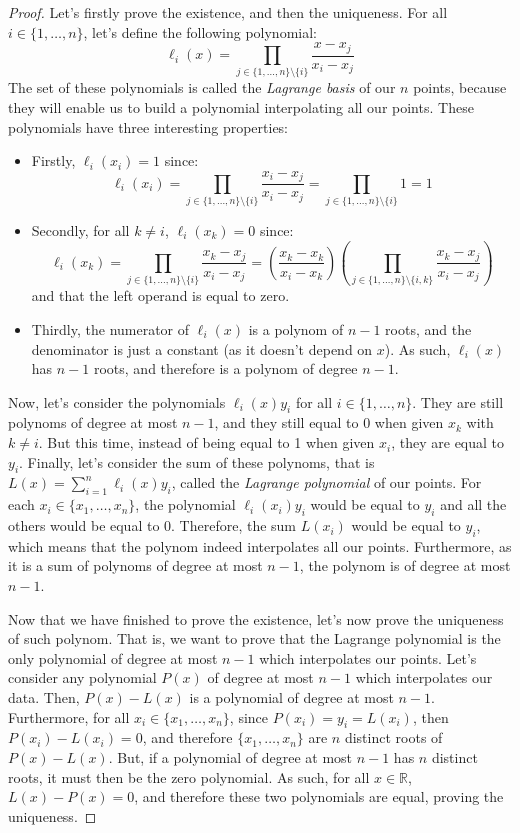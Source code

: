 \documentclass{article}
\theoremstyle{definition}
\theoremstyle{remark}
\theoremstyle{example}
\begin{document}
\begin{proof}
    Let's firstly prove the existence, and then the uniqueness. For all $i \in \{1, \dots, n\}$, let's define the following polynomial:
        $$\ell_i(x) = \prod_{j \in \{1, \dots, n\} \setminus \{i\}} \frac{x - x_j}{x_i - x_j}$$
    The set of these polynomials is called the \textit{Lagrange basis} of our $n$ points, because they will enable us to build a polynomial interpolating all our points. These polynomials have three interesting properties:
    \begin{itemize}
        \item Firstly, $\ell_i(x_i) = 1$ since:
            $$\ell_i(x_i) = \prod_{j \in \{1, \dots, n\} \setminus \{i\}} \frac{x_i - x_j}{x_i - x_j} = \prod_{j \in \{1, \dots, n\} \setminus \{i\}} 1 = 1$$
        \item Secondly, for all $k \neq i$, $\ell_i(x_k) = 0$ since:
        $$\ell_i(x_k) = \prod_{j \in \{1, \dots, n\} \setminus \{i\}} \frac{x_k - x_j}{x_i - x_j} = \left(\frac{x_k - x_k}{x_i - x_k}\right)\left(\prod_{j \in \{1, \dots, n\} \setminus \{i, k\}} \frac{x_k - x_j}{x_i - x_j}\right)$$
        and that the left operand is equal to zero.
        \item Thirdly, the numerator of $\ell_i(x)$ is a polynom of $n-1$ roots, and the denominator is just a constant (as it doesn't depend on $x$). As such, $\ell_i(x)$ has $n-1$ roots, and therefore is a polynom of degree $n-1$.
    \end{itemize}
    Now, let's consider the polynomials $\ell_i(x)y_i$ for all $i \in \{1, \dots, n\}$. They are still polynoms of degree at most $n-1$, and they still equal to 0 when given $x_k$ with $k \neq i$. But this time, instead of being equal to 1 when given $x_i$, they are equal to $y_i$. Finally, let's consider the sum of these polynoms, that is $L(x) = \sum_{i=1}^n \ell_i(x)y_i$, called the \textit{Lagrange polynomial} of our points. For each $x_i \in \{x_1, \dots, x_n\}$, the polynomial $\ell_i(x_i)y_i$ would be equal to $y_i$ and all the others would be equal to 0. Therefore, the sum $L(x_i)$ would be equal to $y_i$, which means that the polynom indeed interpolates all our points. Furthermore, as it is a sum of polynoms of degree at most $n-1$, the polynom is of degree at most $n-1$.

    Now that we have finished to prove the existence, let's now prove the uniqueness of such polynom. That is, we want to prove that the Lagrange polynomial is the only polynomial of degree at most $n-1$ which interpolates our points. Let's consider any polynomial $P(x)$ of degree at most $n-1$ which interpolates our data. Then, $P(x) - L(x)$ is a polynomial of degree at most $n-1$. Furthermore, for all $x_i \in \{x_1, \dots, x_n\}$, since $P(x_i) = y_i = L(x_i)$, then $P(x_i) - L(x_i) = 0$, and therefore $\{x_1, \dots, x_n\}$ are $n$ distinct roots of $P(x) - L(x)$. But, if a polynomial of degree at most $n-1$ has $n$ distinct roots, it must then be the zero polynomial. As such, for all $x \in \mathbb{R}$, $L(x) - P(x) = 0$, and therefore these two polynomials are equal, proving the uniqueness.

\end{proof}
\end{document}
